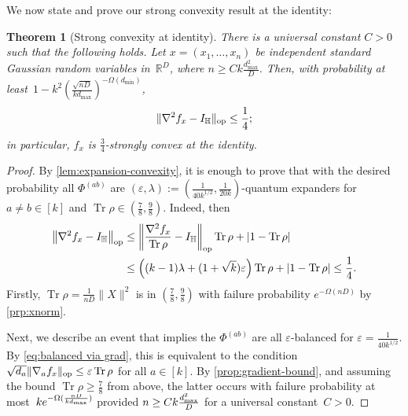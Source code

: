 \documentclass[aos]{imsart}
\newtheorem{theorem}{Theorem}[section]
\theoremstyle{definition}
\numberwithin{equation}{section}
\DeclareMathOperator{\op}{op}
\DeclareMathOperator{\tr}{Tr}
\DeclarePairedDelimiter{\abs}{\lvert}{\rvert}
\DeclarePairedDelimiter{\norm}{\lVert}{\rVert}
\newcommand{\R}{{\mathbb{R}}}
\renewcommand{\H}{{\mathbb{H}}}
\newcommand{\eps}{\varepsilon}
\newcommand{\rv}{x}
\begin{document}
We now state and prove our strong convexity result at the identity:

\begin{theorem}[Strong convexity at identity]\label{thm:tensor-convexity}
There is a universal constant $C>0$ such that the following holds.
Let $x = (x_1,\dots,x_n)$ be independent standard Gaussian random variables in~$\R^D$, where $n \geq C k \frac{d_{\max}^2}D$.
Then, with probability at least~$1 - k^2 ( \frac{\sqrt{nD}}{k d_{\max}} )^{-\Omega(d_{\min})}$,
\begin{align*}
  \norm{\nabla^2 f_x - I_\H}_{\op} \leq \frac14;
\end{align*}
in particular, $f_x$ is $\frac34$-strongly convex at the identity.
\end{theorem}
\begin{proof}
By \cref{lem:expansion-convexity}, it is enough to prove that with the desired probability all $\Phi^{(ab)}$ are $(\eps,\lambda):=(\frac1{40 k^{1/2}},\frac1{20k})$-quantum expanders for $a\neq b\in[k]$ and $\tr \rho \in (\frac78,\frac98)$.
Indeed, then
\begin{align*}
  \norm*{\nabla^2 f_x - I_\H}_{\op}
&\leq \norm*{\frac{\nabla^2 f_x}{\tr \rho} - I_\H}_{\op} \tr \rho + \abs{1 - \tr\rho} \\
&\leq \left( (k-1)\lambda + (1 + \sqrt k) \eps \right) \tr\rho + \abs{1 - \tr\rho}
\leq \frac14.
\end{align*}
Firstly, $\tr \rho = \frac{1}{nD} \|X\|^2$ is in $(\frac78, \frac98)$ with failure probability $e^{-\Omega(nD)}$ by \cref{prp:xnorm}.

Next, we describe an event that implies the $\Phi^{(ab)}$ are all $\eps$-balanced for $\eps=\frac1{40k^{1/2}}$.
By \cref{eq:balanced via grad}, this is equivalent to the condition $\sqrt{d_a} \norm{\nabla_a f_{\rv}}_{\op} \leq \eps \tr \rho$ for all $a \in [k]$.
By \cref{prop:gradient-bound}, and assuming the bound $\tr \rho \geq \frac78$ from above, the latter occurs with failure probability at most~$k \smash{e^{-\Omega(\frac{nD}{k d_{\max}})}}$ provided $n \geq C k \smash{\frac{d_{\max}^2}D}$ for a universal constant~$C>0$.


\end{proof}
\end{document}
